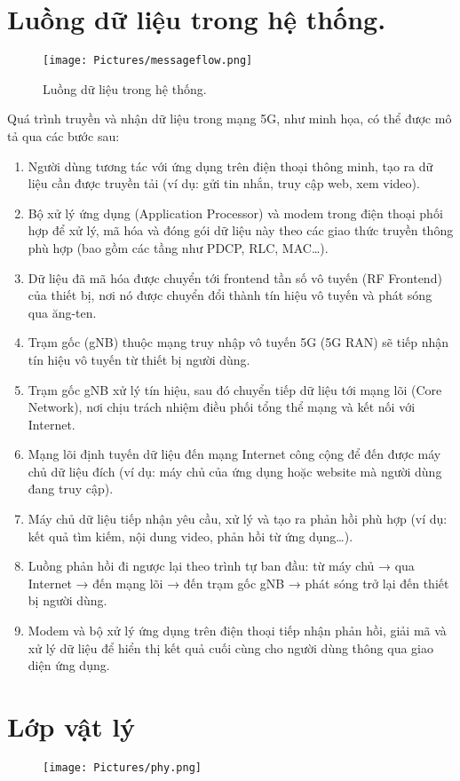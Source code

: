 \section{Luồng dữ liệu trong hệ thống.}
\begin{figure}[H]
    \centering
    \texttt{[image: Pictures/messageflow.png]}
    \caption{Luồng dữ liệu trong hệ thống.}
\end{figure}
Quá trình truyền và nhận dữ liệu trong mạng 5G, như minh họa, có thể được mô tả qua các bước sau:
\begin{enumerate}
    \item Người dùng tương tác với ứng dụng trên điện thoại thông minh, tạo ra dữ liệu cần được truyền tải (ví dụ: gửi tin nhắn, truy cập web, xem video).
    \item  Bộ xử lý ứng dụng (Application Processor) và modem trong điện thoại phối hợp để xử lý, mã hóa và đóng gói dữ liệu này theo các giao thức truyền thông phù hợp (bao gồm các tầng như PDCP, RLC, MAC…).
    \item Dữ liệu đã mã hóa được chuyển tới frontend tần số vô tuyến (RF Frontend) của thiết bị, nơi nó được chuyển đổi thành tín hiệu vô tuyến và phát sóng qua ăng-ten.
    \item Trạm gốc (gNB) thuộc mạng truy nhập vô tuyến 5G (5G RAN) sẽ tiếp nhận tín hiệu vô tuyến từ thiết bị người dùng.
    \item Trạm gốc gNB xử lý tín hiệu, sau đó chuyển tiếp dữ liệu tới mạng lõi (Core Network), nơi chịu trách nhiệm điều phối tổng thể mạng và kết nối với Internet.
    \item Mạng lõi định tuyến dữ liệu đến mạng Internet công cộng để đến được máy chủ dữ liệu đích (ví dụ: máy chủ của ứng dụng hoặc website mà người dùng đang truy cập).
    \item Máy chủ dữ liệu tiếp nhận yêu cầu, xử lý và tạo ra phản hồi phù hợp (ví dụ: kết quả tìm kiếm, nội dung video, phản hồi từ ứng dụng…).
    \item Luồng phản hồi đi ngược lại theo trình tự ban đầu: từ máy chủ → qua Internet → đến mạng lõi → đến trạm gốc gNB → phát sóng trở lại đến thiết bị người dùng.
    \item Modem và bộ xử lý ứng dụng trên điện thoại tiếp nhận phản hồi, giải mã và xử lý dữ liệu để hiển thị kết quả cuối cùng cho người dùng thông qua giao diện ứng dụng.
\end{enumerate}
\section{Lớp vật lý}
\begin{figure}[H]
    \centering
    \texttt{[image: Pictures/phy.png]}
\end{figure}

